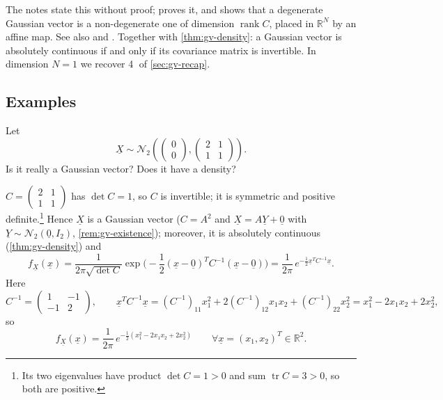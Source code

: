 The notes state this without proof;  proves it, and shows that a degenerate
Gaussian vector is a non-degenerate one of dimension $\operatorname{rank}C$, placed in
$\mathbb R^N$ by an affine map. See also \citet[Section~29, ``Normal Distributions in
$R^k$'']{billingsley} and \citet[Section~3.10]{durrett}. Together with \cref{thm:gv-density}: a
Gaussian vector is absolutely continuous if and only if its covariance matrix is invertible. In
dimension $N=1$ we recover \textcircled{\scriptsize 4} of \cref{sec:gv-recap}.

\subsection*{Examples}

\begin{example}\label{exa:gv-density-from-covariance}
Let
\[
  \underline X\sim\mathcal N_2\left(\begin{pmatrix}0\\0\end{pmatrix},\begin{pmatrix}2&1\\1&1\end{pmatrix}\right).
\]
Is it really a Gaussian vector? Does it have a density?

$C=\begin{pmatrix}2&1\\1&1\end{pmatrix}$ has $\det C=1$, so $C$ is invertible; it is symmetric and
positive definite.\footnote{Its two eigenvalues have product $\det C=1>0$ and sum
$\operatorname{tr}C=3>0$, so both are positive.} Hence $\underline X$ is a Gaussian vector
($C=A^2$ and $\underline X=A\underline Y+\underline 0$ with
$\underline Y\sim\mathcal N_2(\underline 0,I_2)$, \cref{rem:gv-existence}); moreover, it is
absolutely continuous (\cref{thm:gv-density}) and
\[
  f_{\underline X}(\underline x)=\frac1{2\pi\sqrt{\det C}}\exp\Big(-\frac12(\underline x-\underline 0)^TC^{-1}(\underline x-\underline 0)\Big)
  =\frac1{2\pi}\,e^{-\frac12\underline x^TC^{-1}\underline x}.
\]
Here
\[
  C^{-1}=\begin{pmatrix}1&-1\\-1&2\end{pmatrix},\qquad
  \underline x^TC^{-1}\underline x=(C^{-1})_{11}x_1^2+2(C^{-1})_{12}x_1x_2+(C^{-1})_{22}x_2^2
  =x_1^2-2x_1x_2+2x_2^2,
\]
so
\[
  f_{\underline X}(\underline x)=\frac1{2\pi}\,e^{-\frac12(x_1^2-2x_1x_2+2x_2^2)}\qquad
  \forall\underline x=(x_1,x_2)^T\in\mathbb R^2 .
\]
\end{example}


